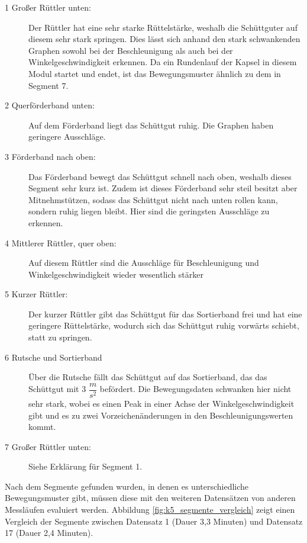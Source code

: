 \begin{description}
	\item [1 Großer Rüttler unten:] Der Rüttler hat eine sehr starke Rüttelstärke, weshalb die Schüttguter auf diesem sehr stark springen. Dies lässt sich anhand den stark schwankenden Graphen sowohl bei der Beschleunigung als auch bei der Winkelgeschwindigkeit erkennen. Da ein Rundenlauf der Kapsel in diesem Modul startet und endet, ist das Bewegungsmuster ähnlich zu dem in Segment 7.
	\item [2 Querförderband unten:] Auf dem Förderband liegt das Schüttgut ruhig. Die Graphen haben geringere Ausschläge. 
	\item [3 Förderband nach oben:] Das Förderband bewegt das Schüttgut schnell nach oben, weshalb dieses Segment sehr kurz ist. Zudem ist dieses Förderband sehr steil besitzt aber Mitnehmstützen, sodass das Schüttgut nicht nach unten rollen kann, sondern ruhig liegen bleibt. Hier sind die geringsten Ausschläge zu erkennen.
	\item [4 Mittlerer Rüttler, quer oben:] Auf diesem Rüttler sind die Ausschläge für Beschleunigung und Winkelgeschwindigkeit wieder wesentlich stärker
	\item [5 Kurzer Rüttler:] Der kurzer Rüttler gibt das Schüttgut für das Sortierband frei und hat eine geringere Rüttelstärke, wodurch sich das Schüttgut ruhig vorwärts schiebt, statt zu springen.
	\item [6 Rutsche und Sortierband] Über die Rutsche fällt das Schüttgut auf das Sortierband, das das Schüttgut mit 3 $\dfrac{m}{s^{2}}$ befördert. Die Bewegungsdaten schwanken hier nicht sehr stark, wobei es einen Peak in einer Achse der Winkelgeschwindigkeit gibt und es zu zwei Vorzeichenänderungen in den Beschleunigungswerten kommt.   
	\item [7 Großer Rüttler unten:] Siehe Erklärung für Segment 1.	
\end{description}

Nach dem Segmente gefunden wurden, in denen es unterschiedliche Bewegungsmuster gibt, müssen diese mit den weiteren Datensätzen von anderen Messläufen evaluiert werden. Abbildung \ref{fig:k5_segmente_vergleich} zeigt einen Vergleich der Segmente zwischen Datensatz 1 (Dauer 3,3 Minuten) und Datensatz 17 (Dauer 2,4 Minuten). 

